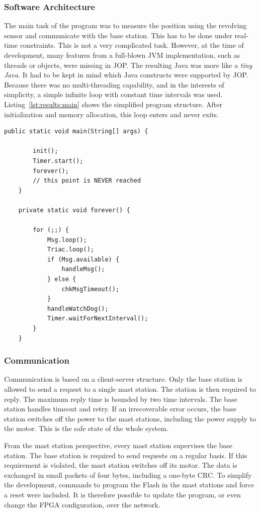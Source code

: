 \subsubsection{Software Architecture}

The main task of the program was to measure the position using the
revolving sensor and communicate with the base station. This has to
be done under real-time constraints. This is not a very complicated
task. However, at the time of development, many features from a
full-blown JVM implementation, such as threads or objects, were
missing in JOP. The resulting Java was more like a \emph{tiny Java}.
It had to be kept in mind which Java constructs were supported by
JOP. Because there was no multi-threading capability, and in the
interests of simplicity, a simple infinite loop with constant time
intervals was used. Listing~\ref{lst:results:main} shows the
simplified program structure. After initialization and memory
allocation, this loop enters and never exits.

\begin{lstlisting}[float,caption=Simplified program structure,
label=lst:results:main]
    public static void main(String[] args) {

        init();
        Timer.start();
        forever();
        // this point is NEVER reached
    }

    private static void forever() {

        for (;;) {
            Msg.loop();
            Triac.loop();
            if (Msg.available) {
                handleMsg();
            } else {
                chkMsgTimeout();
            }
            handleWatchDog();
            Timer.waitForNextInterval();
        }
    }
\end{lstlisting}

\subsubsection{Communication}

Communication is based on a client-server structure. Only the base
station is allowed to send a request to a single mast station. The
station is then required to reply. The maximum reply time is bounded
by two time intervals. The base station handles timeout and retry. If
an irrecoverable error occurs, the base station switches off the
power to the mast stations, including the power supply to the motor.
This is the safe state of the whole system.

From the mast station perspective, every mast station supervises the
base station. The base station is required to send requests on a
regular basis. If this requirement is violated, the mast station
switches off its motor. The data is exchanged in small packets of
four bytes, including a one-byte CRC. To simplify the development,
commands to program the Flash in the mast stations and force a reset
were included. It is therefore possible to update the program, or
even change the FPGA configuration, over the network.

